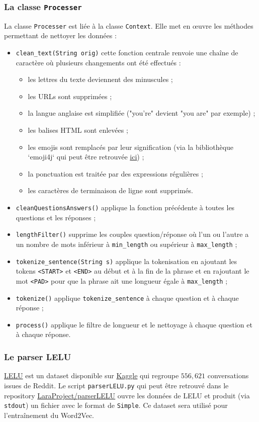 \documentclass[10pt,a4paper]{article}
\begin{document}
\subsubsection{La classe \texttt{Processer}}
La classe \texttt{Processer} est liée à la classe \texttt{Context}. Elle met en œuvre les méthodes permettant de nettoyer les données :
\begin{itemize}
\item \texttt{clean\_text(String orig)} cette fonction centrale renvoie une chaîne de caractère où plusieurs changements ont été effectués :
\begin{itemize}
\item les lettres du texte deviennent des minuscules ;
\item les URLs sont supprimées ;
\item la langue anglaise est simplifiée ("you're" devient "you are" par exemple) ;
\item les balises HTML sont enlevées ;
\item les emojis sont remplacés par leur signification (via la bibliothèque `emoji4j` qui peut être retrouvée \href{https://github.com/kcthota/emoji4j}{ici}) ;
\item la ponctuation est traitée par des expressions régulières ;
\item les caractères de terminaison de ligne sont supprimés.
\end{itemize}
\item \texttt{cleanQuestionsAnswers()} applique la fonction précédente à toutes les questions et les réponses ;
\item \texttt{lengthFilter()} supprime les couples question/réponse où l'un ou l'autre a un nombre de mots inférieur à \texttt{min\_length} ou supérieur à \texttt{max\_length} ;
\item \texttt{tokenize\_sentence(String s)} applique la tokenisation en ajoutant les tokens \texttt{<START>} et \texttt{<END>} au début et à la fin de la phrase et en rajoutant le mot \texttt{<PAD>} pour que la phrase ait une longueur égale à \texttt{max\_length} ;
\item \texttt{tokenize()} applique \texttt{tokenize\_sentence} à chaque question et à chaque réponse ;
\item \texttt{process()} applique le filtre de longueur et le nettoyage à chaque question et à chaque réponse.
\end{itemize}
\subsubsection{Le parser LELU}
\href{https://www.kaggle.com/breandan/french-reddit-discussion}{LELU} est un dataset disponible sur \href{https://www.kaggle.com/breandan/french-reddit-discussion}{Kaggle} qui regroupe $556,621$ conversations issues de Reddit. Le script \texttt{parserLELU.py} qui peut être retrouvé dans le repository \href{https://github.com/LaraProject/parserLELU}{LaraProject/parserLELU} ouvre les données de LELU et produit (via \texttt{stdout}) un fichier avec le format de \texttt{Simple}. Ce dataset sera utilisé pour l'entraînement du Word2Vec.
\end{document}
